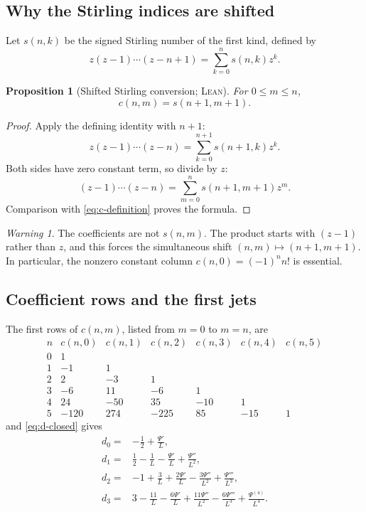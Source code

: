 \documentclass[11pt,oneside]{article}
\newtheorem{proposition}[theorem]{Proposition}
\theoremstyle{definition}
\theoremstyle{remark}
\newtheorem{warning}[theorem]{Warning}
\newcommand{\Formalized}{\textsc{Lean}}
\begin{document}
\subsection{Why the Stirling indices are shifted}

Let $s(n,k)$ be the signed Stirling number of the first kind, defined by
\[
 z(z-1)\cdots(z-n+1)=\sum_{k=0}^n s(n,k)z^k.
\]

\begin{proposition}[Shifted Stirling conversion; \Formalized]
\label{prop:stirling-shift}
For $0\leq m\leq n$,
\[
 c(n,m)=s(n+1,m+1).
\]
\end{proposition}

\begin{proof}
Apply the defining identity with $n+1$:
\[
 z(z-1)\cdots(z-n)
 =\sum_{k=0}^{n+1}s(n+1,k)z^k.
\]
Both sides have zero constant term, so divide by $z$:
\[
 (z-1)\cdots(z-n)
 =\sum_{m=0}^n s(n+1,m+1)z^m.
\]
Comparison with \eqref{eq:c-definition} proves the formula.
\end{proof}

\begin{warning}
The coefficients are not $s(n,m)$.  The product starts with $(z-1)$
rather than $z$, and this forces the simultaneous shift
$(n,m)\mapsto(n+1,m+1)$.  In particular, the nonzero constant column
$c(n,0)=(-1)^nn!$ is essential.
\end{warning}

\subsection{Coefficient rows and the first jets}

The first rows of $c(n,m)$, listed from $m=0$ to $m=n$, are
\[
\begin{array}{c|rrrrrr}
n&c(n,0)&c(n,1)&c(n,2)&c(n,3)&c(n,4)&c(n,5)\\
\hline
0&1\\
1&-1&1\\
2&2&-3&1\\
3&-6&11&-6&1\\
4&24&-50&35&-10&1\\
5&-120&274&-225&85&-15&1
\end{array}
\]
and \eqref{eq:d-closed} gives
\begin{align}
 d_0={}&-\frac12+\frac{\Psi'}L, \label{eq:d0-explicit}\\
 d_1={}&\frac12-\frac1L-\frac{\Psi'}L+\frac{\Psi''}{L^2},
 \label{eq:d1-explicit}\\
 d_2={}&-1+\frac3L+\frac{2\Psi'}L
       -\frac{3\Psi''}{L^2}+\frac{\Psi'''}{L^3},
 \label{eq:d2-explicit}\\
 d_3={}&3-\frac{11}{L}-\frac{6\Psi'}L
       +\frac{11\Psi''}{L^2}-\frac{6\Psi'''}{L^3}
       +\frac{\Psi^{(4)}}{L^4}. \label{eq:d3-explicit}
\end{align}
\end{document}
